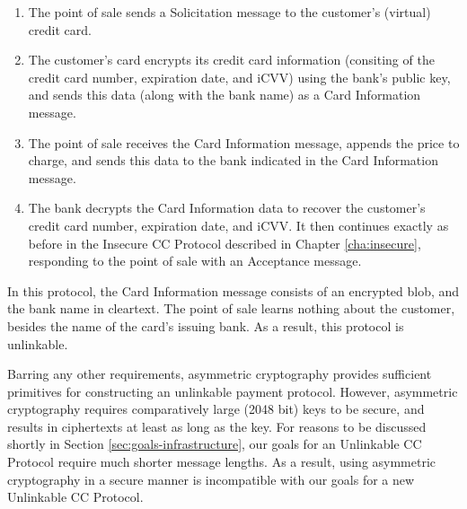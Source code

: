 \begin{enumerate}
    \item The point of sale sends a Solicitation message to the customer's (virtual) credit card.
    \item The customer's card encrypts its credit card information (consiting of the credit card number, expiration date, and iCVV) using the bank's public key,
        and sends this data (along with the bank name) as a Card Information message.
    \item The point of sale receives the Card Information message, appends the price to charge, and sends this data to the bank indicated in the Card Information message.
    \item The bank decrypts the Card Information data to recover the customer's credit card number, expiration date, and iCVV.
        It then continues exactly as before in the Insecure CC Protocol described in Chapter \ref{cha:insecure}, responding to the point of sale with an Acceptance message.
\end{enumerate}

In this protocol, the Card Information message consists of an encrypted blob, and the bank name in cleartext.
The point of sale learns nothing about the customer, besides the name of the card's issuing bank.
As a result, this protocol is unlinkable.

Barring any other requirements, asymmetric cryptography provides sufficient primitives for constructing an unlinkable payment protocol.
However, asymmetric cryptography requires comparatively large (2048 bit) keys to be secure, and results in ciphertexts at least as long as the key.
For reasons to be discussed shortly in Section \ref{sec:goals-infrastructure}, our goals for an Unlinkable CC Protocol require much shorter message lengths.
As a result, using asymmetric cryptography in a secure manner is incompatible with our goals for a new Unlinkable CC Protocol.